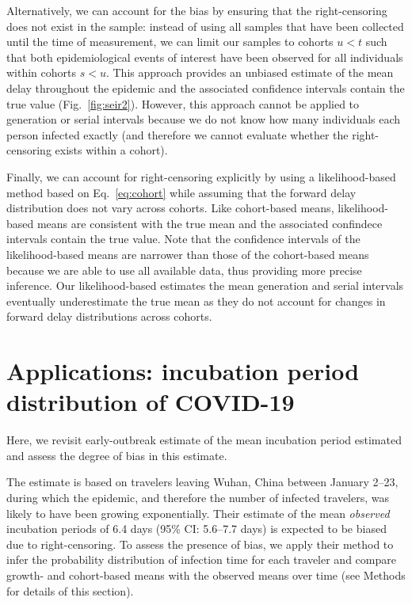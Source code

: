 \documentclass[12pt]{article}
\newcommand{\eref}[1]{Eq.~\ref{eq:#1}}
\newcommand{\fref}[1]{Fig.~\ref{fig:#1}}
\begin{document}
Alternatively, we can account for the bias by ensuring that the right-censoring does not exist in the sample:
instead of using all samples that have been collected until the time of measurement, we can limit our samples to cohorts $u < t$ such that both epidemiological events of interest have been observed for all individuals within cohorts $s < u$.
This approach provides an unbiased estimate of the mean delay throughout the epidemic and the associated confidence intervals contain the true value (\fref{seir2}).
However, this approach cannot be applied to generation or serial intervals because we do not know how many individuals each person infected exactly (and therefore we cannot evaluate whether the right-censoring exists within a cohort).

Finally, we can account for right-censoring explicitly by using a likelihood-based method based on \eref{cohort} while assuming that the forward delay distribution does not vary across cohorts.
Like cohort-based means, likelihood-based means are consistent with the true mean and the associated confindece intervals contain the true value.
Note that the confidence intervals of the likelihood-based means are narrower than those of the cohort-based means because we are able to use all available data, thus providing more precise inference.
Our likelihood-based estimates the mean generation and serial intervals eventually underestimate the true mean as they do not account for changes in forward delay distributions across cohorts.

\section{Applications: incubation period distribution of COVID-19}

Here, we revisit early-outbreak estimate of the mean incubation period estimated and assess the degree of bias in this estimate.
\cite{backer2020incubation} 

The estimate is based on travelers leaving Wuhan, China between January 2--23, during which the epidemic, and therefore the number of infected travelers, was likely to have been growing exponentially.
Their estimate of the mean \emph{observed} incubation periods of 6.4 days (95\% CI: 5.6--7.7 days) is expected to be biased due to right-censoring.
To assess the presence of bias, we apply their method to infer the probability distribution of infection time for each traveler and compare growth- and cohort-based means with the observed means over time (see Methods for details of this section).
\end{document}
